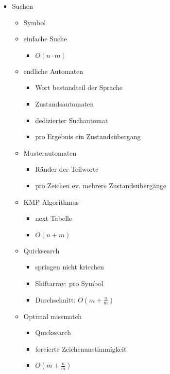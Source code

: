 \begin{itemize}
    \item Suchen
    \begin{itemize}
        \item Symbol
        \item einfache Suche
        \begin{itemize}
            \item $O(n \cdot m)$
        \end{itemize}
        \item endliche Automaten
        \begin{itemize}
            \item Wort bestandteil der Sprache
            \item Zustandsautomaten
            \item dedizierter Suchautomat
            \item pro Ergebnis ein Zustandsübergang
        \end{itemize}
        \item Musterautomaten
        \begin{itemize}
            \item Ränder der Teilworte
            \item pro Zeichen ev. mehrere Zustandsübergänge
        \end{itemize}
        \item KMP Algorithmus
        \begin{itemize}
            \item next Tabelle
            \item $O(n + m)$
        \end{itemize}
        \item Quicksearch
        \begin{itemize}
            \item springen nicht kriechen
            \item Shiftarray: pro Symbol
            \item Durchschnitt: $O(m + \frac{n}{m})$
        \end{itemize}
        \item Optimal missmatch
        \begin{itemize}
            \item Quicksearch
            \item forcierte Zeichenunstimmigkeit
            \item $O(m + \frac{n}{m})$
        \end{itemize}
    \end{itemize}
    
\end{itemize}